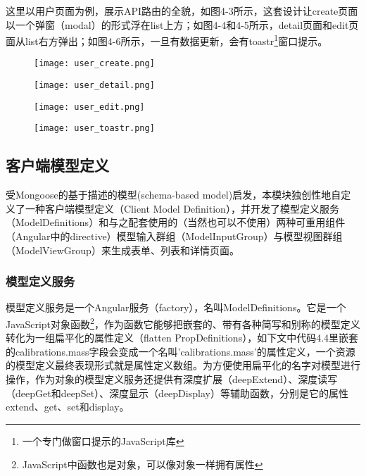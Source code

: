 这里以用户页面为例，展示API路由的全貌，如图4-3所示，这套设计让create页面以一个弹窗（modal）的形式浮在list上方；如图4-4和4-5所示，detail页面和edit页面从list右方弹出；如图4-6所示，一旦有数据更新，会有toastr\footnote{一个专门做窗口提示的JavaScript库}窗口提示。
\begin{figure}[H]
 \centering
 \texttt{[image: user\_create.png]}
\end{figure}
\begin{figure}[H]
 \centering
 \texttt{[image: user\_detail.png]}
\end{figure}
\begin{figure}[H]
 \centering
 \texttt{[image: user\_edit.png]}
\end{figure}
\begin{figure}[H]
 \centering
 \texttt{[image: user\_toastr.png]}
\end{figure}

\subsection{客户端模型定义}
受Mongoose的基于描述的模型(schema-based model)启发，本模块独创性地自定义了一种客户端模型定义（Client Model Definition），并开发了模型定义服务（ModelDefinitions）和与之配套使用的（当然也可以不使用）两种可重用组件（Angular中的directive）模型输入群组（ModelInputGroup）与模型视图群组（ModelViewGroup）来生成表单、列表和详情页面。

\subsubsection{模型定义服务}
模型定义服务是一个Angular服务（factory），名叫ModelDefinitions。它是一个JavaScript对象函数\footnote{JavaScript中函数也是对象，可以像对象一样拥有属性}，作为函数它能够把嵌套的、带有各种简写和别称的模型定义转化为一组扁平化的属性定义（flatten PropDefinitions），如下文中代码4.4里嵌套的calibrations.mass字段会变成一个名叫'calibrations.mass'的属性定义，一个资源的模型定义最终表现形式就是属性定义数组。为方便使用扁平化的名字对模型进行操作，作为对象的模型定义服务还提供有深度扩展（deepExtend）、深度读写（deepGet和deepSet）、深度显示（deepDisplay）等辅助函数，分别是它的属性extend、get、set和display。

